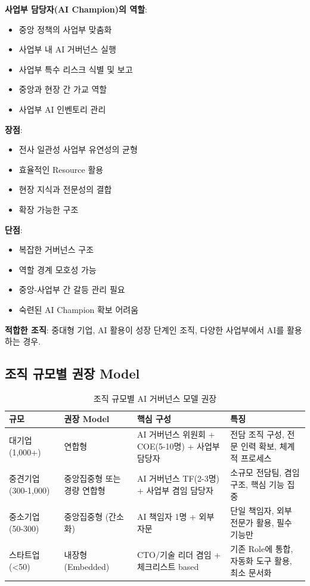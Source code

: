 \textbf{사업부 담당자(AI Champion)의 역할}:
\begin{itemize}
 \item 중앙 정책의 사업부 맞춤화
 \item 사업부 내 AI 거버넌스 실행
 \item 사업부 특수 리스크 식별 및 보고
 \item 중앙과 현장 간 가교 역할
 \item 사업부 AI 인벤토리 관리
\end{itemize}

\textbf{장점}:
\begin{itemize}
 \item 전사 일관성 사업부 유연성의 균형\cite{ransbotham2017reshaping}
 \item 효율적인 Resource 활용\cite{iansiti2020competing}
 \item 현장 지식과 전문성의 결합
 \item 확장 가능한 구조
\end{itemize}

\textbf{단점}:
\begin{itemize}
 \item 복잡한 거버넌스 구조
 \item 역할 경계 모호성 가능
 \item 중앙-사업부 간 갈등 관리 필요
 \item 숙련된 AI Champion 확보 어려움
\end{itemize}

\textbf{적합한 조직}: 
중대형 기업, AI 활용이 성장 단계인 조직, 
다양한 사업부에서 AI를 활용하는 경우.


\subsection{조직 규모별 권장 Model}
\label{sec:4.1.3}

\begin{table}[htbp]
\centering
\caption{조직 규모별 AI 거버넌스 모델 권장}
\label{tab:model_by_size}
\begin{tabularx}{\textwidth}{p{2cm}p{2.5cm}p{4cm}X}
\toprule
\textbf{규모} & \textbf{권장 Model} & \textbf{핵심 구성} & \textbf{특징} \\
\midrule
대기업 (1,000+) & 
연합형 & 
AI 거버넌스 위원회\cite{butcher2019state} + COE(5-10명) + 사업부 담당자 & 
전담 조직 구성, 전문 인력 확보, 체계적 프로세스 \\
\midrule
중견기업 (300-1,000) & 
중앙집중형 또는 경량 연합형 & 
AI 거버넌스 TF(2-3명) + 사업부 겸임 담당자 & 
소규모 전담팀, 겸임 구조, 핵심 기능 집중 \\
\midrule
중소기업 (50-300) & 
중앙집중형 (간소화) & 
AI 책임자 1명 + 외부 자문 & 
단일 책임자, 외부 전문가 활용, 필수 기능만 \\
\midrule
스타트업 (<50) & 
내장형 (Embedded) & 
CTO/기술 리더 겸임 + 체크리스트 based & 
기존 Role에 통합, 자동화 도구 활용, 최소 문서화 \\
\bottomrule
\end{tabularx}
\end{table}



